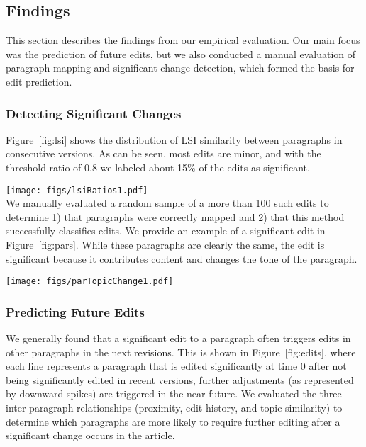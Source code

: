 \subsection{Findings}\label{findings}

This section describes the findings from our empirical evaluation. Our
main focus was the prediction of future edits, but we also conducted a
manual evaluation of paragraph mapping and significant change detection,
which formed the basis for edit prediction.

\subsubsection{Detecting Significant
Changes}\label{detecting-significant-changes}

Figure~{[}fig:lsi{]} shows the distribution of LSI similarity between
paragraphs in consecutive versions. As can be seen, most edits are
minor, and with the threshold ratio of 0.8 we labeled about 15\% of the
edits as significant.

\texttt{[image: figs/lsiRatios1.pdf]}\\

We manually evaluated a random sample of a more than 100 such edits to
determine 1) that paragraphs were correctly mapped and 2) that this
method successfully classifies edits. We provide an example of a
significant edit in Figure~{[}fig:pars{]}. While these paragraphs are
clearly the same, the edit is significant because it contributes content
and changes the tone of the paragraph.

\texttt{[image: figs/parTopicChange1.pdf]}\\

\subsubsection{Predicting Future Edits}\label{predicting-future-edits-1}

We generally found that a significant edit to a paragraph often triggers
edits in other paragraphs in the next revisions. This is shown in
Figure~{[}fig:edits{]}, where each line represents a paragraph that is
edited significantly at time 0 after not being significantly edited in
recent versions, further adjustments (as represented by downward spikes)
are triggered in the near future. We evaluated the three inter-paragraph
relationships (proximity, edit history, and topic similarity) to
determine which paragraphs are more likely to require further editing
after a significant change occurs in the article.

